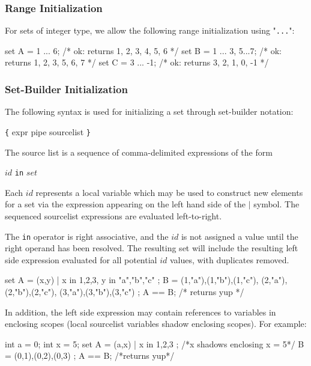 	\subsubsection{Range Initialization}
	For sets of integer type, we allow the following range initialization using "\verb|...|":

\begin{code}	
set A = {1 ... 6}; /* ok: returns {1, 2, 3, 4, 5, 6} */
set B = {1 ... 3, 5...7}; /* ok: returns {1, 2, 3, 5, 6, 7} */
set C = {3 ... -1}; /* ok: returns {3, 2, 1, 0, -1} */
\end{code}
		
	\subsubsection{Set-Builder Initialization}
	The following syntax is used for initializing a set through set-builder notation:
	\begin{grammar}
	\verb|{| expr pipe sourcelist \verb|}|
	\end{grammar}
	The source list is a sequence of comma-delimited expressions of the form 
	\begin{center}
	$id$ \verb|in| $set$  
	\end{center}	
	Each $id$ represents a local variable which may be used to construct new elements for a set via the expression appearing on the left hand side of the $\vert$ symbol.  The sequenced sourcelist expressions are evaluated left-to-right.  
	
	The \verb|in| operator is right associative, and the $id$ is not assigned a value until the right operand has been resolved.  The resulting set will include the resulting left side expression evaluated for all potential $id$ values, with duplicates removed.

\begin{code}
set A = { (x,y) | x in {1,2,3}, y in {"a","b","c"} };
B = { (1,"a"),(1,"b"),(1,"c"),
      (2,"a"),(2,"b"),(2,"c"),
      (3,"a"),(3,"b"),(3,"c") };
A == B; /* returns yup */
\end{code}

In addition, the left side expression may contain references to variables in enclosing scopes (local sourcelist variables shadow enclosing scopes).  For example:

\begin{code}
int a = 0;
int x = 5;	
set A = { (a,x) | x in {1,2,3} }; /*x shadows enclosing x = 5*/
B = { (0,1),(0,2),(0,3) };
A == B; /*returns yup*/
\end{code}

